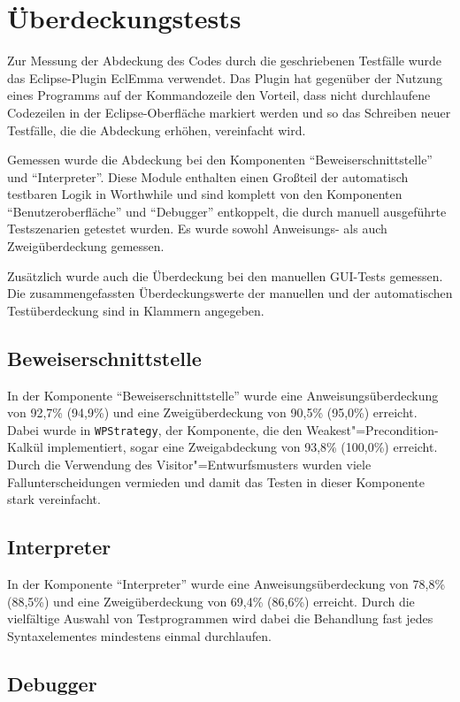 \section{Überdeckungstests}
Zur Messung der Abdeckung des Codes durch die geschriebenen Testfälle wurde das Eclipse-Plugin EclEmma verwendet. Das Plugin hat gegenüber der Nutzung eines Programms auf der Kommandozeile den Vorteil, dass nicht durchlaufene Codezeilen in der Eclipse-Oberfläche markiert werden und so das Schreiben neuer Testfälle, die die Abdeckung erhöhen, vereinfacht wird.

Gemessen wurde die Abdeckung bei den Komponenten "`Beweiserschnittstelle"' und "`Interpreter"'. Diese Module enthalten einen Großteil der automatisch testbaren Logik in Worthwhile und sind komplett von den Komponenten "`Benutzeroberfläche"' und "`Debugger"' entkoppelt, die durch manuell ausgeführte Testszenarien getestet wurden. Es wurde sowohl Anweisungs- als auch Zweigüberdeckung gemessen.

Zusätzlich wurde auch die Überdeckung bei den manuellen GUI-Tests gemessen. Die zusammengefassten Überdeckungswerte der manuellen und der automatischen Testüberdeckung sind in Klammern angegeben.

\subsection{Beweiserschnittstelle}
In der Komponente "`Beweiserschnittstelle"' wurde eine Anweisungsüberdeckung von 92,7\% (94,9\%) und eine Zweigüberdeckung von 90,5\% (95,0\%) erreicht. Dabei wurde in \texttt{WPStrategy}, der Komponente, die den Weakest"=Precondition-Kalkül implementiert, sogar eine Zweigabdeckung von 93,8\% (100,0\%) erreicht. Durch die Verwendung des Visitor"=Entwurfsmusters wurden viele Fallunterscheidungen vermieden und damit das Testen in dieser Komponente stark vereinfacht.

\subsection{Interpreter}
In der Komponente "`Interpreter"' wurde eine Anweisungsüberdeckung von 78,8\% (88,5\%) und eine Zweigüberdeckung von 69,4\% (86,6\%) erreicht. Durch die vielfältige Auswahl von Testprogrammen wird dabei die Behandlung fast jedes Syntaxelementes mindestens einmal durchlaufen.

\subsection{Debugger}

